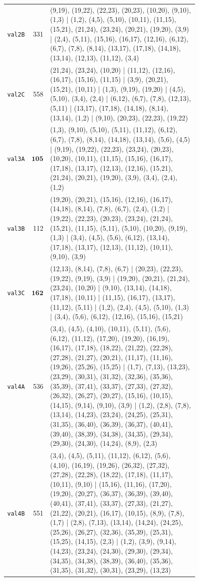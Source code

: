\begin{landscape}
\begin{longtable}{lr>{\tiny\raggedright\arraybackslash}p{0.78\linewidth}}
\texttt{val2B} & 331 & (9,19), (19,22), (22,23), (20,23), (10,20), (9,10), (1,3) | (1,2), (4,5), (5,10), (10,11), (11,15), (15,21), (21,24), (23,24), (20,21), (19,20), (3,9) | (2,4), (5,11), (15,16), (16,17), (12,16), (6,12), (6,7), (7,8), (8,14), (13,17), (17,18), (14,18), (13,14), (12,13), (11,12), (3,4) \\[2pt]
\texttt{val2C} & 558 & (21,24), (23,24), (10,20) | (11,12), (12,16), (16,17), (15,16), (11,15) | (3,9), (20,21), (15,21), (10,11) | (1,3), (9,19), (19,20) | (4,5), (5,10), (3,4), (2,4) | (6,12), (6,7), (7,8), (12,13), (5,11) | (13,17), (17,18), (14,18), (8,14), (13,14), (1,2) | (9,10), (20,23), (22,23), (19,22) \\[2pt]
\texttt{val3A} & $\mathbf{105}$ & (1,3), (9,10), (5,10), (5,11), (11,12), (6,12), (6,7), (7,8), (8,14), (14,18), (13,14), (5,6), (4,5) | (9,19), (19,22), (22,23), (23,24), (20,23), (10,20), (10,11), (11,15), (15,16), (16,17), (17,18), (13,17), (12,13), (12,16), (15,21), (21,24), (20,21), (19,20), (3,9), (3,4), (2,4), (1,2) \\[2pt]
\texttt{val3B} & 112 & (19,20), (20,21), (15,16), (12,16), (16,17), (14,18), (8,14), (7,8), (6,7), (2,4), (1,2) | (19,22), (22,23), (20,23), (23,24), (21,24), (15,21), (11,15), (5,11), (5,10), (10,20), (9,19), (1,3) | (3,4), (4,5), (5,6), (6,12), (13,14), (17,18), (13,17), (12,13), (11,12), (10,11), (9,10), (3,9) \\[2pt]
\texttt{val3C} & $\mathbf{162}$ & (12,13), (8,14), (7,8), (6,7) | (20,23), (22,23), (19,22), (9,19), (3,9) | (19,20), (20,21), (21,24), (23,24), (10,20) | (9,10), (13,14), (14,18), (17,18), (10,11) | (11,15), (16,17), (13,17), (11,12), (5,11) | (1,2), (2,4), (4,5), (5,10), (1,3) | (3,4), (5,6), (6,12), (12,16), (15,16), (15,21) \\[2pt]
\texttt{val4A} & 536 & (3,4), (4,5), (4,10), (10,11), (5,11), (5,6), (6,12), (11,12), (17,20), (19,20), (16,19), (16,17), (17,18), (18,22), (21,22), (22,28), (27,28), (21,27), (20,21), (11,17), (11,16), (19,26), (25,26), (15,25) | (1,7), (7,13), (13,23), (23,29), (30,31), (31,32), (32,36), (35,36), (35,39), (37,41), (33,37), (27,33), (27,32), (26,32), (26,27), (20,27), (15,16), (10,15), (14,15), (9,14), (9,10), (3,9) | (1,2), (2,8), (7,8), (13,14), (14,23), (23,24), (24,25), (25,31), (31,35), (36,40), (36,39), (36,37), (40,41), (39,40), (38,39), (34,38), (34,35), (29,34), (29,30), (24,30), (14,24), (8,9), (2,3) \\[2pt]
\texttt{val4B} & 551 & (3,4), (4,5), (5,11), (11,12), (6,12), (5,6), (4,10), (16,19), (19,26), (26,32), (27,32), (27,28), (22,28), (18,22), (17,18), (11,17), (10,11), (9,10) | (15,16), (11,16), (17,20), (19,20), (20,27), (36,37), (36,39), (39,40), (40,41), (37,41), (33,37), (27,33), (21,27), (21,22), (20,21), (16,17), (10,15), (8,9), (7,8), (1,7) | (2,8), (7,13), (13,14), (14,24), (24,25), (25,26), (26,27), (32,36), (35,39), (25,31), (15,25), (14,15), (2,3) | (1,2), (3,9), (9,14), (14,23), (23,24), (24,30), (29,30), (29,34), (34,35), (34,38), (38,39), (36,40), (35,36), (31,35), (31,32), (30,31), (23,29), (13,23) \\[2pt]

\end{longtable}
\end{landscape}
